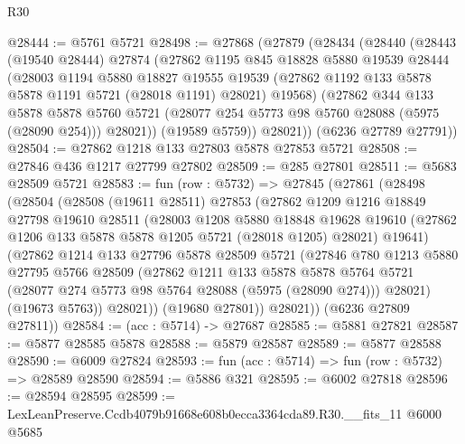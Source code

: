 \begin{lexlean}{R30}
\begin{coremodule}
@28444 := @5761 @5721
@28498 := @27868
    (@27879
      (@28434
        (@28440
          (@28443
            (@19540 @28444)
            @27874
            (@27862
              @1195
              @845
              @18828
              @5880
              @19539
              @28444
              (@28003
                @1194
                @5880
                @18827
                @19555
                @19539
                (@27862 @1192 @133 @5878 @5878 @1191 @5721 (@28018 @1191) @28021)
                @19568)
              (@27862
                @344
                @133
                @5878
                @5878
                @5760
                @5721
                (@28077 @254 @5773 @98 @5760 @28088 (@5975 (@28090 @254)))
                @28021))
            (@19589 @5759))
          @28021))
      (@6236 @27789 @27791))
@28504 := @27862 @1218 @133 @27803 @5878 @27853 @5721
@28508 := @27846 @436 @1217 @27799 @27802
@28509 := @285 @27801
@28511 := @5683 @28509 @5721
@28583 := fun (row : @5732) =>
  @27845
    (@27861
      (@28498
        (@28504
          (@28508
            (@19611 @28511)
            @27853
            (@27862
              @1209
              @1216
              @18849
              @27798
              @19610
              @28511
              (@28003
                @1208
                @5880
                @18848
                @19628
                @19610
                (@27862 @1206 @133 @5878 @5878 @1205 @5721 (@28018 @1205) @28021)
                @19641)
              (@27862
                @1214
                @133
                @27796
                @5878
                @28509
                @5721
                (@27846
                  @780
                  @1213
                  @5880
                  @27795
                  @5766
                  @28509
                  (@27862
                    @1211
                    @133
                    @5878
                    @5878
                    @5764
                    @5721
                    (@28077 @274 @5773 @98 @5764 @28088 (@5975 (@28090 @274)))
                    @28021)
                  (@19673 @5763))
                @28021))
            (@19680 @27801))
          @28021))
      (@6236 @27809 @27811))
@28584 := (acc : @5714) -> @27687
@28585 := @5881 @27821
@28587 := @5877 @28585 @5878
@28588 := @5879 @28587
@28589 := @5877 @28588
@28590 := @6009 @27824
@28593 := fun (acc : @5714) => fun (row : @5732) => @28589 @28590
@28594 := @5886 @321
@28595 := @6002 @27818
@28596 := @28594 @28595
@28599 := LexLeanPreserve.Ccdb4079b91668e608b0ecca3364cda89.R30.__fits_11 @6000 @5685

\end{coremodule}
\end{lexlean}

